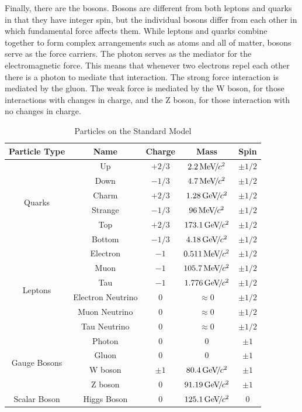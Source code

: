 Finally, there are the bosons. Bosons are different from both leptons and quarks in that they have integer spin, but the individual bosons differ from each other in which fundamental force affects them. While leptons and quarks combine together to form complex arrangements such as atoms and all of matter, bosons serve as the force carriers. The photon serves as the mediator for the electromagnetic force. This means that whenever two electrons repel each other there is a photon to mediate that interaction. The strong force interaction is mediated by the gluon. The weak force is mediated by the W boson, for those interactions with changes in charge, and the Z boson, for those interaction with no changes in charge. 

\begin{table}
\caption{Particles on the Standard Model}
\label{tab:particles}
\begin{center}
\begin{tabular}{|c|c|c|c|c|}
\hline
Particle Type & Name & Charge & Mass & Spin \\
\hline
\multirow{6}{*}{Quarks} & Up & $+2/3$ & $2.2{\,\text{Me\hspace{-.08em}V\hspace{-0.16em}/\hspace{-0.08em}}c^\text{2}}$ & $\pm 1/2$ \\
& Down & $-1/3$ & $4.7{\,\text{Me\hspace{-.08em}V\hspace{-0.16em}/\hspace{-0.08em}}c^\text{2}}$ & $\pm 1/2$ \\
& Charm & $+2/3$ & $1.28{\,\text{Ge\hspace{-.08em}V\hspace{-0.16em}/\hspace{-0.08em}}c^\text{2}}$ & $\pm 1/2$ \\
& Strange & $-1/3$ & $96{\,\text{Me\hspace{-.08em}V\hspace{-0.16em}/\hspace{-0.08em}}c^\text{2}}$ & $\pm 1/2$ \\
& Top & $+2/3$ & $173.1{\,\text{Ge\hspace{-.08em}V\hspace{-0.16em}/\hspace{-0.08em}}c^\text{2}}$ & $\pm 1/2$ \\
& Bottom & $-1/3$ & $4.18{\,\text{Ge\hspace{-.08em}V\hspace{-0.16em}/\hspace{-0.08em}}c^\text{2}}$ & $\pm 1/2$ \\
\hline
\multirow{6}{*}{Leptons} & Electron & $-1$ & $0.511{\,\text{Me\hspace{-.08em}V\hspace{-0.16em}/\hspace{-0.08em}}c^\text{2}}$ & $\pm 1/2$ \\
& Muon & $-1$ & $105.7{\,\text{Me\hspace{-.08em}V\hspace{-0.16em}/\hspace{-0.08em}}c^\text{2}}$ & $\pm 1/2$ \\
& Tau & $-1$ & $1.776{\,\text{Ge\hspace{-.08em}V\hspace{-0.16em}/\hspace{-0.08em}}c^\text{2}}$ & $\pm 1/2$ \\
& Electron Neutrino & $0$ & $\approx 0$ & $\pm 1/2$ \\
& Muon Neutrino & $0$ & $\approx 0$ & $\pm 1/2$ \\
& Tau Neutrino & $0$ & $\approx 0$ & $\pm 1/2$ \\
\hline
\multirow{4}{*}{Gauge Bosons} & Photon & 0 & 0 & $\pm 1$ \\
& Gluon & 0 & 0 & $\pm 1$ \\
& W boson & $\pm 1$ & $80.4{\,\text{Ge\hspace{-.08em}V\hspace{-0.16em}/\hspace{-0.08em}}c^\text{2}}$ & $\pm 1$ \\
& Z boson & 0 & $91.19{\,\text{Ge\hspace{-.08em}V\hspace{-0.16em}/\hspace{-0.08em}}c^\text{2}}$ & $\pm 1$ \\
\hline
Scalar Boson & Higgs Boson & 0 & $125.1{\,\text{Ge\hspace{-.08em}V\hspace{-0.16em}/\hspace{-0.08em}}c^\text{2}}$ & 0 \\
\hline
\end{tabular}
\end{center}
\end{table} 
